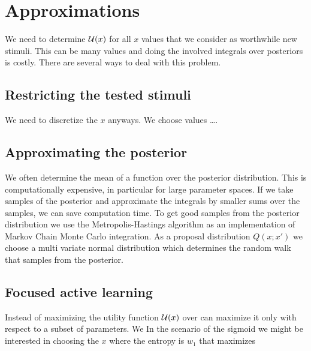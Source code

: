 
\section{Approximations} %
\label{sec:approximations}
We need to determine $\mathcal{U}(x)$ for all $x$ values that we consider as worthwhile new stimuli. This can be many values and doing the involved integrals over posteriors is costly.
There are several ways to deal with this problem.

\subsection{Restricting the tested stimuli} %
\label{sub:restricting_the_tested_stimuli}
We need to discretize the $x$ anyways. We choose values \dots.

\subsection{Approximating the posterior} %
 \label{sub:approximating_the_posterior}
We often determine the mean of a function over the posterior distribution. This is computationally expensive, in particular for large parameter spaces.
If we take samples of the posterior and approximate the integrals by smaller sums over the samples, we can save computation time. To get good samples from the posterior distribution we use the Metropolis-Hastings algorithm as an implementation of Markov Chain Monte Carlo integration.
As a proposal distribution $Q(x;x')$ we choose a multi variate normal distribution which determines the random walk that samples from the posterior.

\subsection{Focused active learning} %
\label{sub:focused_active_learning}
Instead of maximizing the utility function $\mathcal{U}(x)$ over can maximize it only with respect to a subset of parameters.
We 
In the scenario of the sigmoid we might be interested in choosing the $x$ where the entropy is $w_1$ that maximizes 

